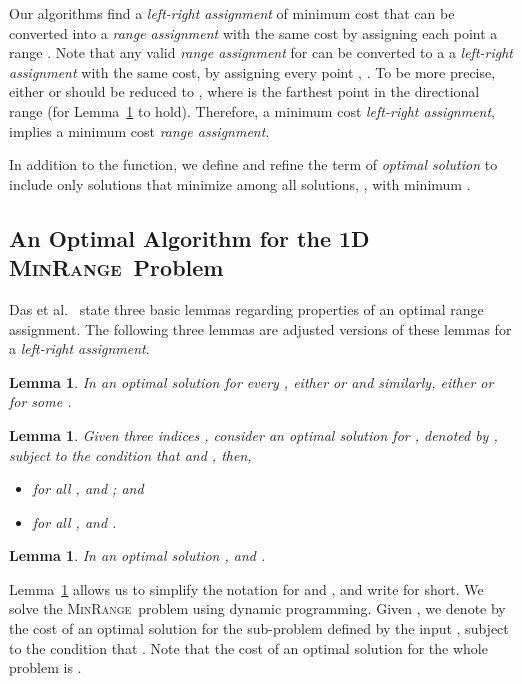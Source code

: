 \documentclass[a4paper]{article}
\newtheorem{lemma}[theorem]{Lemma}
\newcommand{\MCRA}{\textsc{MinRange}}
\begin{document}
Our algorithms find a \emph{left-right assignment} of minimum cost
that can be converted into a \emph{range assignment}  with the same cost
by assigning each point  a range .
Note that any valid \emph{range assignment} for  can be converted to a a \emph{left-right assignment}
with the same cost, by assigning every point , .
To be more precise, either  or  should be reduced to , 
where  is the farthest point in the directional range 
(for Lemma~\ref{lem:range_ij} to hold).
Therefore, a minimum cost \emph{left-right assignment}, implies a minimum cost \emph{range assignment}.

In addition to the  function, we define 
and refine the term of \emph{optimal solution} to include
only solutions that minimize 
among all solutions, , with minimum .





\subsection{An Optimal Algorithm for the 1D \MCRA \ Problem}\label{sec:LinMinCostRange}
Das et al.~\cite{DasGN07} state three basic lemmas regarding properties of an optimal range assignment.
The following three lemmas are adjusted versions of these lemmas for a \emph{left-right assignment}.
\begin{lemma}\label{lem:range_ij}
In an optimal solution  
for every ,
either   or  
and similarly, either  or  for some .
\end{lemma}
\begin{lemma}\label{lem:range_line}
Given three indices , consider an optimal solution for , 
denoted by , subject to the condition that  and ,
then, 
\begin{itemize}
	\item  for all ,  and ; and
   \item for all ,  and .
\end{itemize}
\end{lemma}
\begin{lemma}\label{lem:range_12}
In an optimal solution ,
 and .
\end{lemma}

Lemma~\ref{lem:range_ij} allows us to simplify the notation 
 for  and ,  
and write  for short.
We solve the \MCRA\ problem using dynamic programming.
Given , we denote by  the cost of an optimal solution for the sub-problem
defined by the input , subject to the condition that .
Note that the cost of an optimal solution for the whole problem is .
\end{document}
